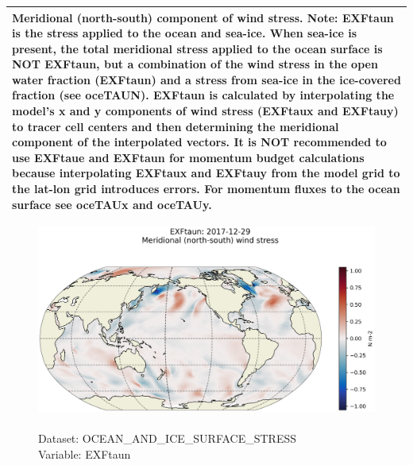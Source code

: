 \begin{longtable}{|p{}|p{}|p{}|p{}|}
\multicolumn{4}{|p{1\textwidth}|}{Meridional (north-south) component of wind stress. Note: EXFtaun is the stress applied to the ocean and sea-ice. When sea-ice is present, the total meridional stress applied to the ocean surface is NOT EXFtaun, but a combination of the wind stress in the open water fraction (EXFtaun) and a stress from sea-ice in the ice-covered fraction (see oceTAUN).  EXFtaun is calculated by interpolating the model's x and y components of wind stress (EXFtaux and EXFtauy) to tracer cell centers and then determining the meridional component of the interpolated vectors. It is NOT recommended to use EXFtaue and EXFtaun for momentum budget calculations because interpolating EXFtaux and EXFtauy from the model grid to the lat-lon grid introduces errors. For momentum fluxes to the ocean surface see oceTAUx and oceTAUy.} \\ \hline
\end{longtable}

\begin{figure}[H]
\centering
\includegraphics[scale=0.5]{../images/plots/latlon_plots/Ocean_and_Sea-Ice_Surface_Stress/EXFtaun.png}
\caption{\\Dataset: OCEAN\_AND\_ICE\_SURFACE\_STRESS\\Variable: EXFtaun}
\label{tab:table-OCEAN_AND_ICE_SURFACE_STRESS_EXFtaun-Plot}
\end{figure}
\pagebreak
